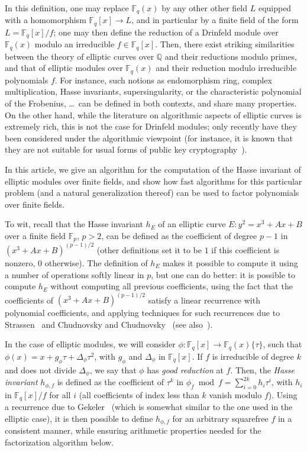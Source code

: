 \documentclass[12pt]{article}
\theoremstyle{plain}
\theoremstyle{definition}
\newcommand{\ang}[1]{\{#1\}}
\def\Q{\ensuremath{\mathbb{Q}}}
\def\F{\ensuremath{\mathbb{F}}}
\begin{document}
In this definition, one may replace $\F_q(x)$ by any other other field
$L$ equipped with a homomorphism $\F_q[x]\to L$, and in particular by
a finite field of the form $L=\F_q[x]/f$; one may then define the {\rm
  reduction} of a Drinfeld module over $\F_q(x)$ modulo an irreducible
$f \in \F_q[x]$. Then, there exist striking similarities between the
theory of elliptic curves over $\Q$ and their reductions modulo
primes, and that of elliptic modules over $\F_q(x)$ and their
reduction modulo irreducible polynomials $f$. For instance, such
notions as endomorphism ring, complex multiplication, Hasse
invariants, supersingularity, or the characteristic polynomial of the
Frobenius, \dots~can be defined in both contexts, and share many
properties. On the other hand, while the literature on algorithmic
aspects of elliptic curves is extremely rich, this is not the case for
Drinfeld modules; only recently have they been considered under the
algorithmic viewpoint (for instance, it is known that they are not
suitable for usual forms of public key cryptography~\cite{Scanlon01}).

In this article, we give an algorithm for the computation of the Hasse
invariant of elliptic modules over finite fields, and show how fast
algorithms for this particular problem (and a natural generalization
thereof) can be used to factor polynomials over finite fields.

To wit, recall that the Hasse invariant $h_E$ of an elliptic curve $E:
y^2=x^3+Ax+B$ over a finite field $\F_p$, $p>2$, can be defined as the
coefficient of degree $p-1$ in $(x^3+Ax+B)^{(p-1)/2}$ (other
definitions set it to be $1$ if this coefficient is nonzero, $0$
otherwise). The definition of $h_E$ makes it possible to compute it
using a number of operations softly linear in $p$, but one can do
better: it is possible to compute $h_E$ without computing all previous
coefficients, using the fact that the coefficients of 
$(x^3+Ax+B)^{(p-1)/2}$ satisfy a linear recurrence with polynomial
coefficients, and applying techniques for such recurrences due to
Strassen~\cite{Strassen76} and Chudnovsky and
Chudnovsky~\cite{ChCh88} (see also~\cite{BoGaSc07}).

In the case of elliptic modules, we will consider $\phi: \F_q[x] \to
\F_q(x)\ang{\tau}$, such that $\phi(x)=x+ g_\phi \tau+\Delta_\phi
\tau^2$, with $g_\phi$ and $\Delta_\phi$ in $\F_q[x]$. If $f$ is
irreducible of degree $k$ and does not divide $\Delta_\phi$,
we say that $\phi$ has {\em good reduction} at $f$. Then, the {\em
  Hasse invariant} $h_{\phi,f}$ is defined as the coefficient of
$\tau^k$ in $\phi_f\bmod f =\sum_{i=0}^{2k} h_i \tau^i$, with $h_i$
in $\F_q[x]/f$ for all $i$ (all coefficients of index less than $k$
vanish modulo $f$).  Using a recurrence due to Gekeler~\cite{gek}
(which is somewhat similar to the one used in the elliptic case), it
is then possible to define $h_{\phi,f}$ for an arbitrary squarefree
$f$ in a consistent manner, while ensuring arithmetic properties
needed for the factorization algorithm below.
\end{document}
